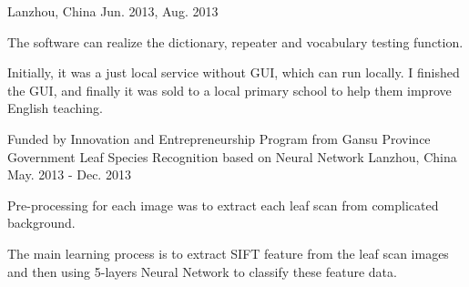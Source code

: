 \begin{cventries}
    {Lanzhou, China}
    {Jun. 2013, Aug. 2013}
    {
      \begin{cvitems}
        \item {The software can realize the dictionary, repeater and vocabulary testing function.}
        \item {Initially, it was a just local service without GUI, which can run locally. I finished the GUI, and finally it was sold to a local primary school to help them improve English teaching.}
      \end{cvitems}
    }
  \cventry
    {Funded by Innovation and Entrepreneurship Program from Gansu Province Government}
    {Leaf Species Recognition based on Neural Network}
    {Lanzhou, China}
    {May. 2013 - Dec. 2013}
    {
      \begin{cvitems}
        \item {Pre-processing for each image was to extract each leaf scan from complicated background.}
        \item {The main learning process is to extract SIFT feature from the leaf scan images and then using 5-layers Neural Network to classify these feature data.}
      \end{cvitems}
    }
\end{cventries}
